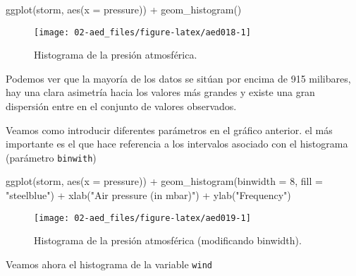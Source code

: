 \documentclass[
]{book}
\newenvironment{Shaded}{\begin{snugshade}}{\end{snugshade}}
\newcommand{\AttributeTok}[1]{\textcolor[rgb]{0.77,0.63,0.00}{#1}}
\newcommand{\DecValTok}[1]{\textcolor[rgb]{0.00,0.00,0.81}{#1}}
\newcommand{\FunctionTok}[1]{\textcolor[rgb]{0.00,0.00,0.00}{#1}}
\newcommand{\NormalTok}[1]{#1}
\newcommand{\SpecialCharTok}[1]{\textcolor[rgb]{0.00,0.00,0.00}{#1}}
\newcommand{\StringTok}[1]{\textcolor[rgb]{0.31,0.60,0.02}{#1}}
\begin{document}
\begin{Shaded}
\begin{Highlighting}[]
\FunctionTok{ggplot}\NormalTok{(storm, }\FunctionTok{aes}\NormalTok{(}\AttributeTok{x =}\NormalTok{ pressure)) }\SpecialCharTok{+}
   \FunctionTok{geom\_histogram}\NormalTok{()}
\end{Highlighting}
\end{Shaded}

\begin{figure}

{\centering \texttt{[image: 02-aed\_files/figure-latex/aed018-1]} 

}

\caption{Histograma de la presión atmosférica.}\label{fig:aed018}
\end{figure}

Podemos ver que la mayoría de los datos se sitúan por encima de 915 milibares, hay una clara asimetría hacia los valores más grandes y existe una gran dispersión entre en el conjunto de valores observados.

Veamos como introducir diferentes parámetros en el gráfico anterior. el más importante es el que hace referencia a los intervalos asociado con el histograma (parámetro \texttt{binwith})

\begin{Shaded}
\begin{Highlighting}[]
\FunctionTok{ggplot}\NormalTok{(storm, }\FunctionTok{aes}\NormalTok{(}\AttributeTok{x =}\NormalTok{ pressure)) }\SpecialCharTok{+} 
  \FunctionTok{geom\_histogram}\NormalTok{(}\AttributeTok{binwidth =} \DecValTok{8}\NormalTok{, }\AttributeTok{fill =} \StringTok{"steelblue"}\NormalTok{) }\SpecialCharTok{+} 
  \FunctionTok{xlab}\NormalTok{(}\StringTok{"Air pressure (in mbar)"}\NormalTok{) }\SpecialCharTok{+} \FunctionTok{ylab}\NormalTok{(}\StringTok{"Frequency"}\NormalTok{)}
\end{Highlighting}
\end{Shaded}

\begin{figure}

{\centering \texttt{[image: 02-aed\_files/figure-latex/aed019-1]} 

}

\caption{Histograma de la presión atmosférica (modificando binwidth).}\label{fig:aed019}
\end{figure}

Veamos ahora el histograma de la variable \texttt{wind}
\end{document}
